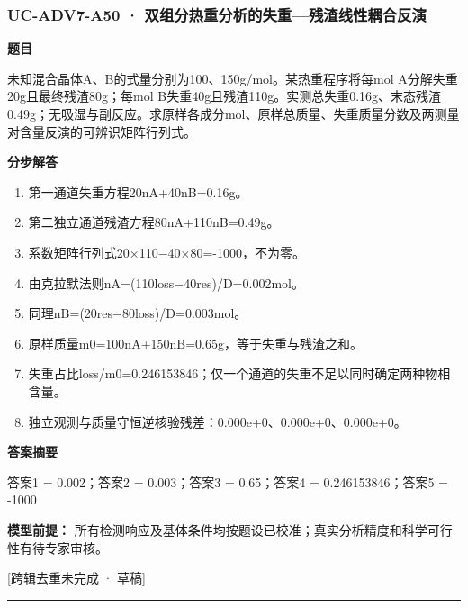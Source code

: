 \documentclass[UTF8,11pt,a4paper]{ctexart}
\begin{document}
\subsubsection*{UC-ADV7-A50 · 双组分热重分析的失重—残渣线性耦合反演}
\noindent\textbf{题目}\par
未知混合晶体A、B的式量分别为100、150g/mol。某热重程序将每mol A分解失重20g且最终残渣80g；每mol B失重40g且残渣110g。实测总失重0.16g、末态残渣0.49g；无吸湿与副反应。求原样各成分mol、原样总质量、失重质量分数及两测量对含量反演的可辨识矩阵行列式。\par
\medskip\noindent\textbf{分步解答}
\begin{enumerate}
\item 第一通道失重方程20nA+40nB=0.16g。
\item 第二独立通道残渣方程80nA+110nB=0.49g。
\item 系数矩阵行列式20×110−40×80=-1000，不为零。
\item 由克拉默法则nA=(110loss−40res)/D=0.002mol。
\item 同理nB=(20res−80loss)/D=0.003mol。
\item 原样质量m0=100nA+150nB=0.65g，等于失重与残渣之和。
\item 失重占比loss/m0=0.246153846；仅一个通道的失重不足以同时确定两种物相含量。
\item 独立观测与质量守恒逆核验残差：0.000e+0、0.000e+0、0.000e+0。
\end{enumerate}
\noindent\textbf{答案摘要}\par
答案1 = 0.002；答案2 = 0.003；答案3 = 0.65；答案4 = 0.246153846；答案5 = -1000\par
\noindent\textbf{模型前提：}
所有检测响应及基体条件均按题设已校准；真实分析精度和科学可行性有待专家审核。\par
\noindent\textcolor{red!65!black}{[跨辑去重未完成 · 草稿]} \par
\medskip\hrule\medskip
{}
\end{document}
